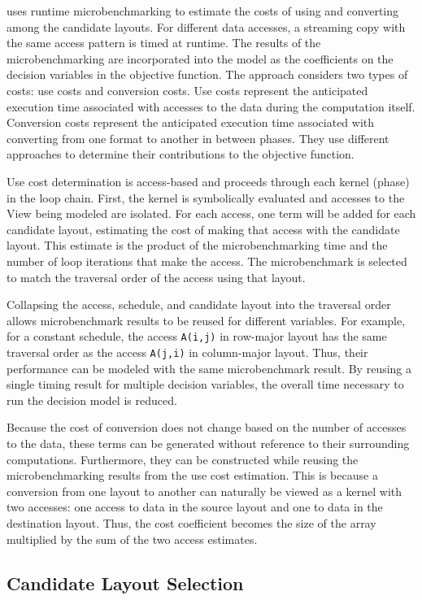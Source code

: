 \FormatDecisions{} uses runtime microbenchmarking to estimate the costs of using and converting among the candidate layouts. 
For different data accesses, a streaming copy with the same access pattern is timed at runtime.
The results of the microbenchmarking are incorporated into the model as the coefficients on the decision variables in the objective function.
The approach considers two types of costs: use costs and conversion costs.
Use costs represent the anticipated execution time associated with accesses to the data during the computation itself.
Conversion costs represent the anticipated execution time associated with converting from one format to another in between phases.
They use different approaches to determine their contributions to the objective function.

Use cost determination is access-based and proceeds through each kernel (phase) in the loop chain.
First, the kernel is symbolically evaluated and accesses to the View being modeled are isolated.
For each access, one term will be added for each candidate layout, estimating the cost of making that access with the candidate layout.
This estimate is the product of the microbenchmarking time and the number of loop iterations that make the access.
The microbenchmark is selected to match the traversal order of the access using that layout.

Collapsing the access, schedule, and candidate layout into the traversal order allows microbenchmark results to be reused for different variables. 
For example, for a constant schedule, the access \verb.A(i,j). in row-major layout has the same traversal order as the access \verb.A(j,i). in column-major layout.
Thus, their performance can be modeled with the same microbenchmark result. 
By reusing a single timing result for multiple decision variables, the overall time necessary to run the decision model is reduced.

Because the cost of conversion does not change based on the number of accesses to the data, these terms can be generated without reference to their surrounding computations.
Furthermore, they can be constructed while reusing the microbenchmarking results from the use cost estimation.
This is because a conversion from one layout to another can naturally be viewed as a kernel with two accesses: one access to data in the source layout and one to data in the destination layout.
Thus, the cost coefficient becomes the size of the array multiplied by the sum of the two access estimates.


\subsection{Candidate Layout Selection}\label{sec:candidateSelection}\label{generationScheme}

